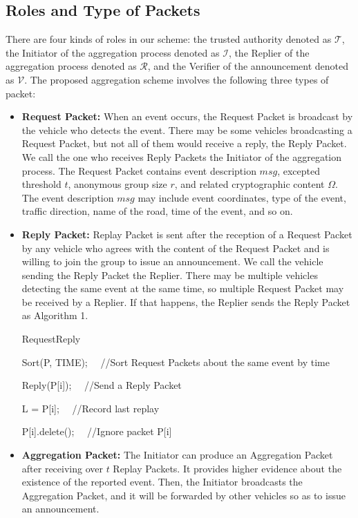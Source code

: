 \documentclass[a4paper]{article}
\begin{document}
\subsection{Roles and Type of Packets}
There are four kinds of roles in our scheme: the trusted authority denoted as $\mathcal{T}$, the Initiator of the aggregation process denoted as $\mathcal{I}$, the Replier of the aggregation process denoted as $\mathcal{R}$, and the Verifier of the announcement denoted as $\mathcal{V}$. The proposed aggregation scheme involves the following three types of packet:

\begin{itemize}
  \item \textbf{Request Packet: } When an event occurs, the Request Packet is broadcast by the vehicle who detects the event. There may be some vehicles broadcasting a Request Packet, but not all of them would receive a reply, the Reply Packet. We call the one who receives Reply Packets the Initiator of the aggregation process. The Request Packet contains event description $msg$, excepted threshold $t$, anonymous group size $r$, and related cryptographic content $\Omega$. The event description $msg$ may include event coordinates, type of the event, traffic direction, name of the road, time of the event, and so on.
  \item \textbf{Reply Packet: } Replay Packet is sent after the reception of a Request Packet by any vehicle who agrees with the content of the Request Packet and is willing to join the group to issue an announcement. We call the vehicle sending the Reply Packet the Replier. There may be multiple vehicles detecting the same event at the same time, so multiple Request Packet may be received by a Replier. If that happens, the Replier sends the Reply Packet as Algorithm 1.

\begin{algorithm}
\caption{RequestReply}

Sort(P, TIME);  ~~//Sort Request Packets about the same event by time

{
    {
        Reply(P[i]);    ~~//Send a Reply Packet

        L = P[i];  ~~//Record last replay
    }
    \Else
    {
        P[i].delete();  ~~//Ignore packet P[i]
    }
}
\end{algorithm}

  \item \textbf{Aggregation Packet: } The Initiator can produce an Aggregation Packet after receiving over $t$ Replay Packets. It provides higher evidence about the existence of the reported event. Then, the Initiator broadcasts the Aggregation Packet, and it will be forwarded by other vehicles so as to issue an announcement.
\end{itemize}
\end{document}

